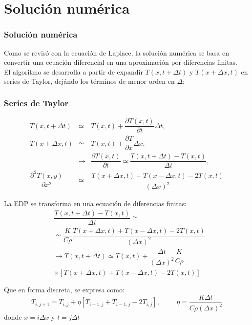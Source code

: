 \section{Solución numérica}
\begin{frame}
\frametitle{Solución numérica}
Como se revisó con la ecuación de Laplace, la solución numérica se basa en convertir una ecuación diferencial en una aproximación por diferencias finitas.
\\
\medskip
El algoritmo se desarrolla a partir de expandir
 $T(x, t+\Delta t)$ y $T(x+ \Delta x,t)$ en series de Taylor, dejándo los términos de menor orden en $\Delta$:
\end{frame}
\begin{frame}
\fontsize{12}{12}\selectfont
\frametitle{Series de Taylor}
\begin{eqnarray*}
T(x,t + \Delta t) &\simeq & T(x,t) + \dfrac{\partial T(x,t)}{\partial t} \Delta t, \\
T(x+ \Delta x, t) &\simeq & T(x,t) + \dfrac{\partial T}{\partial x} \Delta x, \\
&\longrightarrow &\dfrac{\partial T(x,t)}{\partial t} \simeq \dfrac{T(x,t + \Delta t) - T(x,t)}{\Delta t}, \\
\dfrac{\partial^{2} T(x,y)}{\partial x^{2}} &\simeq & \dfrac{T(x+\Delta x,t)+ T(x-\Delta x, t)- 2T(x,t)}{(\Delta x)^{2}}
\end{eqnarray*}
\end{frame}
\begin{frame}
La EDP se transforma en una ecuación de diferencias finitas:
\begin{align*}
& \dfrac{T(x,t + \Delta t)- T(x,t)}{\Delta t}  \simeq    \\
& \simeq  \dfrac{K}{C \rho} \dfrac{T(x + \Delta x, t)+ T(x-\Delta x,t)- 2T(x,t)}{(\Delta x)^{2}} \\
& \longrightarrow  T(x,t+\Delta t) \simeq T(x,t)+\dfrac{\Delta t}{(\Delta x)^{2}}\dfrac{K}{C \rho} \\
& \times  [T(x+\Delta x, t)+T(x-\Delta x,t) - 2T(x,t)]
\end{align*}
\end{frame}
\begin{frame}
Que en forma discreta, se expresa como:
\[ T_{i,j+1}=T_{i,j} + \eta [T_{i+1,j}+T_{i-1,j}-2T_{i,j}], \hspace{1cm} \eta = \dfrac{K \Delta t}{C \rho (\Delta x)^{2}} \]
donde $x=i\Delta x$ y $t=j \Delta t$
\end{frame}
